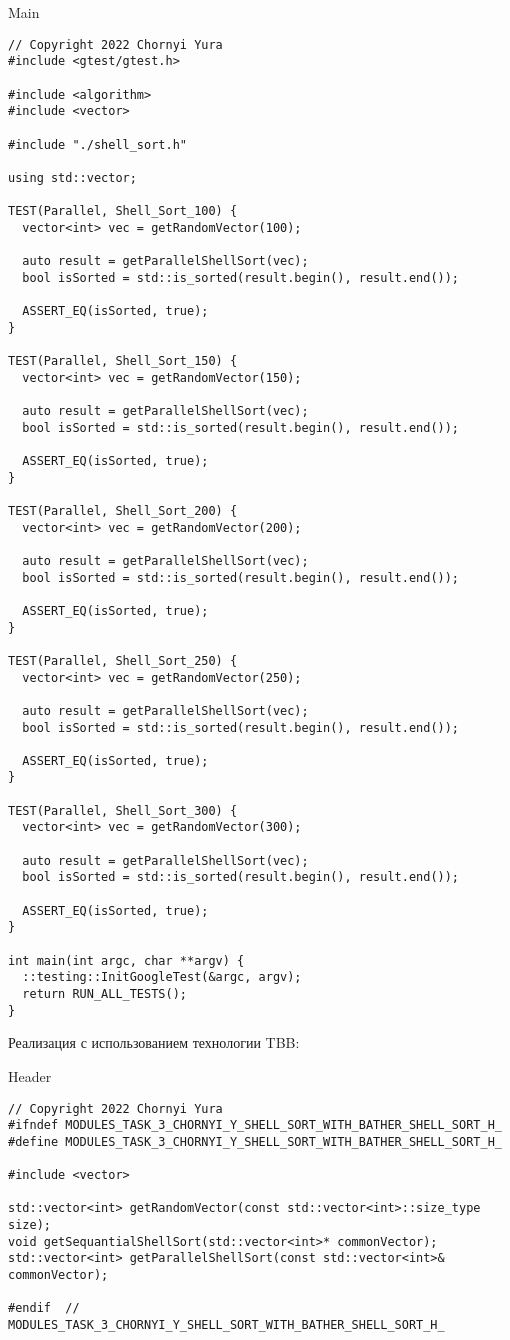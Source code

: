\documentclass{report}
\begin{document}
\begin{center}
Main
\end{center}
\begin{lstlisting}
// Copyright 2022 Chornyi Yura
#include <gtest/gtest.h>

#include <algorithm>
#include <vector>

#include "./shell_sort.h"

using std::vector;

TEST(Parallel, Shell_Sort_100) {
  vector<int> vec = getRandomVector(100);

  auto result = getParallelShellSort(vec);
  bool isSorted = std::is_sorted(result.begin(), result.end());

  ASSERT_EQ(isSorted, true);
}

TEST(Parallel, Shell_Sort_150) {
  vector<int> vec = getRandomVector(150);

  auto result = getParallelShellSort(vec);
  bool isSorted = std::is_sorted(result.begin(), result.end());

  ASSERT_EQ(isSorted, true);
}

TEST(Parallel, Shell_Sort_200) {
  vector<int> vec = getRandomVector(200);

  auto result = getParallelShellSort(vec);
  bool isSorted = std::is_sorted(result.begin(), result.end());

  ASSERT_EQ(isSorted, true);
}

TEST(Parallel, Shell_Sort_250) {
  vector<int> vec = getRandomVector(250);

  auto result = getParallelShellSort(vec);
  bool isSorted = std::is_sorted(result.begin(), result.end());

  ASSERT_EQ(isSorted, true);
}

TEST(Parallel, Shell_Sort_300) {
  vector<int> vec = getRandomVector(300);

  auto result = getParallelShellSort(vec);
  bool isSorted = std::is_sorted(result.begin(), result.end());

  ASSERT_EQ(isSorted, true);
}

int main(int argc, char **argv) {
  ::testing::InitGoogleTest(&argc, argv);
  return RUN_ALL_TESTS();
}
\end{lstlisting}

\newpage

\par Реализация с использованием технологии TBB:
\begin{center}
Header
\end{center}
\begin{lstlisting}
// Copyright 2022 Chornyi Yura
#ifndef MODULES_TASK_3_CHORNYI_Y_SHELL_SORT_WITH_BATHER_SHELL_SORT_H_
#define MODULES_TASK_3_CHORNYI_Y_SHELL_SORT_WITH_BATHER_SHELL_SORT_H_

#include <vector>

std::vector<int> getRandomVector(const std::vector<int>::size_type size);
void getSequantialShellSort(std::vector<int>* commonVector);
std::vector<int> getParallelShellSort(const std::vector<int>& commonVector);

#endif  // MODULES_TASK_3_CHORNYI_Y_SHELL_SORT_WITH_BATHER_SHELL_SORT_H_
\end{lstlisting}
\end{document}
